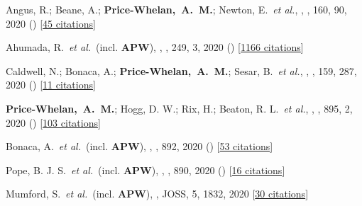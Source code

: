 {\item[{\color{deemph}\scriptsize77}]Angus, R.; Beane, A.; \textbf{Price-Whelan,~A.~M.}; Newton, E.~\textit{et al.}, , \aj, 160, 90, 2020 () [\href{http://adsabs.harvard.edu/abs/2020AJ....160...90A}{45 citations}]

\item[{\color{deemph}\scriptsize76}]Ahumada, R.~\textit{et al.}~(incl. \textbf{APW}), , \apjs, 249, 3, 2020 () [\href{http://adsabs.harvard.edu/abs/2020ApJS..249....3A}{1166 citations}]

\item[{\color{deemph}\scriptsize75}]Caldwell, N.; Bonaca, A.; \textbf{Price-Whelan,~A.~M.}; Sesar, B.~\textit{et al.}, , \aj, 159, 287, 2020 () [\href{http://adsabs.harvard.edu/abs/2020AJ....159..287C}{11 citations}]

\item[{\color{deemph}\scriptsize74}]\textbf{Price-Whelan,~A.~M.}; Hogg, D. W.; Rix, H.; Beaton, R. L.~\textit{et al.}, , \apj, 895, 2, 2020 () [\href{http://adsabs.harvard.edu/abs/2020ApJ...895....2P}{103 citations}]

\item[{\color{deemph}\scriptsize73}]Bonaca, A.~\textit{et al.}~(incl. \textbf{APW}), , \apj, 892, 2020 () [\href{http://adsabs.harvard.edu/abs/2020ApJ...892L..37B}{53 citations}]

\item[{\color{deemph}\scriptsize72}]Pope, B. J. S.~\textit{et al.}~(incl. \textbf{APW}), , \apj, 890, 2020 () [\href{http://adsabs.harvard.edu/abs/2020ApJ...890L..19P}{16 citations}]

\item[{\color{deemph}\scriptsize71}]Mumford, S.~\textit{et al.}~(incl. \textbf{APW}), , JOSS, 5, 1832, 2020 [\href{http://adsabs.harvard.edu/abs/2020JOSS....5.1832M}{30 citations}]

}
